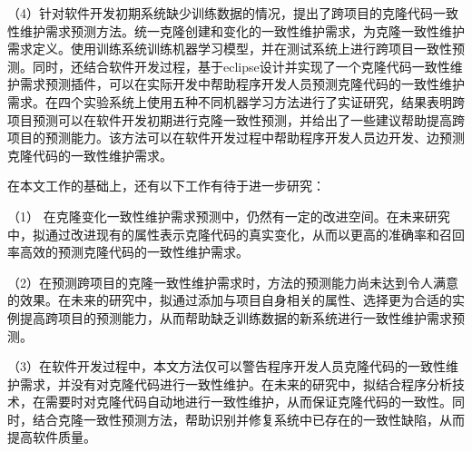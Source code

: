（4）针对软件开发初期系统缺少训练数据的情况，提出了跨项目的克隆代码一致性维护需求预测方法。统一克隆创建和变化的一致性维护需求，为克隆一致性维护需求定义。使用训练系统训练机器学习模型，并在测试系统上进行跨项目一致性预测。同时，还结合软件开发过程，基于eclipse设计并实现了一个克隆代码一致性维护需求预测插件，可以在实际开发中帮助程序开发人员预测克隆代码的一致性维护需求。在四个实验系统上使用五种不同机器学习方法进行了实证研究，结果表明跨项目预测可以在软件开发初期进行克隆一致性预测，并给出了一些建议帮助提高跨项目的预测能力。该方法可以在软件开发过程中帮助程序开发人员边开发、边预测克隆代码的一致性维护需求。

在本文工作的基础上，还有以下工作有待于进一步研究：

（1） 在克隆变化一致性维护需求预测中，仍然有一定的改进空间。在未来研究中，拟通过改进现有的属性表示克隆代码的真实变化，从而以更高的准确率和召回率高效的预测克隆代码的一致性维护需求。

（2）在预测跨项目的克隆一致性维护需求时，方法的预测能力尚未达到令人满意的效果。在未来的研究中，拟通过添加与项目自身相关的属性、选择更为合适的实例提高跨项目的预测能力，从而帮助缺乏训练数据的新系统进行一致性维护需求预测。

（3）在软件开发过程中，本文方法仅可以警告程序开发人员克隆代码的一致性维护需求，并没有对克隆代码进行一致性维护。在未来的研究中，拟结合程序分析技术，在需要时对克隆代码自动地进行一致性维护，从而保证克隆代码的一致性。同时，结合克隆一致性预测方法，帮助识别并修复系统中已存在的一致性缺陷，从而提高软件质量。